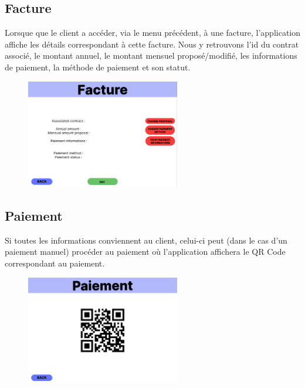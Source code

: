 \subsection{Facture}
\begin{flushleft}
Lorsque que le client a accéder, via le menu précédent, à une facture, l'application affiche les détails correspondant à cette facture. Nous y retrouvons l'id du contrat associé, le montant annuel, le montant mensuel proposé/modifié, les informations de paiement, la méthode de paiement et son statut.
\end{flushleft}
\begin{figure}[h]
\centering
\includegraphics[width = 0.6\textwidth]{extension-maxime/interface/img/facture.png}
\end{figure}

\newpage
\subsection{Paiement}
\begin{flushleft}
Si toutes les informations conviennent au client, celui-ci peut (dans le cas d'un paiement manuel) procéder au paiement où l'application affichera le QR Code correspondant au paiement.
\end{flushleft}
\begin{figure}[h]
\centering
\includegraphics[width = 0.6\textwidth]{extension-maxime/interface/img/paiement.png}
\end{figure}

